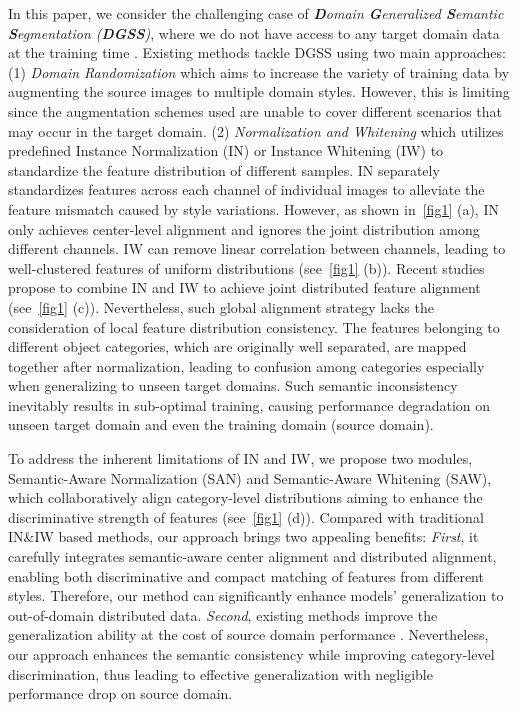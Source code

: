 \documentclass[10pt,twocolumn,letterpaper]{article}
\begin{document}
In this paper, we consider the challenging case of \textit{\textbf{D}omain \textbf{G}eneralized \textbf{S}emantic \textbf{S}egmentation (\textbf{DGSS})}, where we do not have access to any target domain data at the training time \cite{choi2021robustnet,pan2018two,pan2019switchable,peng2021global,yue2019domain}. Existing methods tackle DGSS using two main approaches: (1) \textit{Domain Randomization} \cite{yue2019domain,peng2021global} which aims to increase the variety of training data by augmenting the source images to multiple domain styles. However, this is limiting since the augmentation schemes used are unable to cover different scenarios that may occur in the target domain. (2) \textit{Normalization and Whitening} \cite{pan2018two,pan2019switchable,choi2021robustnet} which utilizes predefined Instance Normalization (IN) \cite{ulyanov2017improved} or Instance Whitening (IW) \cite{li2017universal} to standardize the feature distribution of different samples.
IN separately standardizes features across each channel of individual images to alleviate the feature mismatch caused by style variations. However, as shown in~\cref{fig1} (a), IN only achieves center-level alignment and ignores the joint distribution among different channels. IW can remove linear correlation between channels, leading to well-clustered features of uniform distributions (see~\cref{fig1} (b)). Recent studies \cite{pan2019switchable,choi2021robustnet} propose to combine IN and IW to achieve joint distributed feature alignment (see~\cref{fig1} (c)). Nevertheless, such global alignment strategy lacks the consideration of local feature distribution consistency. The features belonging to different object categories, which are originally well separated, are mapped together after normalization, leading to confusion among categories especially when generalizing to unseen target domains. Such semantic inconsistency inevitably results in sub-optimal training, causing performance degradation on unseen target domain and even the training domain (\ie source domain).

To address the inherent limitations of IN and IW, we propose two modules, Semantic-Aware Normalization (SAN) and Semantic-Aware Whitening (SAW), which collaboratively align category-level distributions aiming to enhance the discriminative strength of features (see~\cref{fig1} (d)).
Compared with traditional IN\&IW based methods, our approach brings two appealing benefits:
\textit{First}, it carefully integrates semantic-aware center alignment and distributed alignment, enabling both discriminative and compact matching of features from different styles. Therefore, our method can significantly enhance models' generalization to out-of-domain distributed data.
\textit{Second}, existing methods improve the generalization ability at the cost of source domain performance \cite{pan2018two,choi2021robustnet}. Nevertheless, our approach enhances the semantic consistency while improving category-level discrimination, thus leading to effective generalization with negligible performance drop on source domain.
\end{document}
